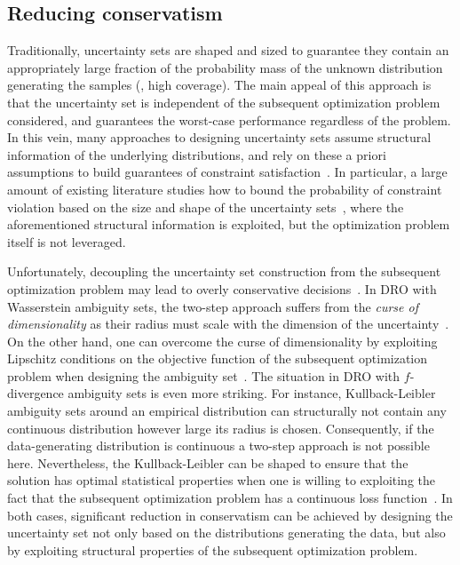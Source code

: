 \subsection{Reducing conservatism}
Traditionally, uncertainty sets are shaped and sized to guarantee they contain an appropriately large fraction of the probability mass of the unknown distribution generating the samples (\ie, high coverage). The main appeal of this approach is that the uncertainty set is independent of the subsequent optimization problem considered, and guarantees the worst-case performance regardless of the problem.
In this vein, many approaches to designing uncertainty sets assume structural information of the underlying distributions, and rely on these a priori assumptions to build guarantees of constraint satisfaction~\citep{ben-tal_robust_2000,bertsimassurvey,bandi_tractable_2012}.
In particular, a large amount of existing literature studies how to bound the probability of constraint violation based on the size and shape of the uncertainty sets~\citep{guarantees_2012, guarantees1}, where the aforementioned structural information is exploited, but the optimization problem itself is not leveraged.


Unfortunately, decoupling the uncertainty set construction from the subsequent optimization problem  may lead to overly conservative decisions~\citep{reduce_conserve,gao2016distributionally}.
In \gls{DRO} with Wasserstein ambiguity sets, the two-step approach suffers from the {\it curse of dimensionality} as their radius must scale with the dimension of the uncertainty~\citep{wass_rate}.
On the other hand, one can overcome the curse of dimensionality by exploiting Lipschitz conditions on the objective function of the subsequent optimization problem when designing the ambiguity set~\citep{DBLP:gao2020}.
The situation in \gls{DRO} with $f$-divergence ambiguity sets is even more striking.
For instance, Kullback-Leibler ambiguity sets around an empirical distribution can structurally not contain any continuous distribution however large its radius is chosen.
Consequently, if the data-generating distribution is continuous a two-step approach is not possible here. Nevertheless, the Kullback-Leibler can be shaped to ensure that the solution has optimal statistical properties when one is willing to exploiting the fact that the subsequent optimization problem has a continuous loss function~\citep{vanparys2021data}.
In both cases, significant reduction in conservatism can be achieved by designing the uncertainty set not only based on the distributions generating the data, but also by exploiting structural properties of the subsequent optimization problem.

